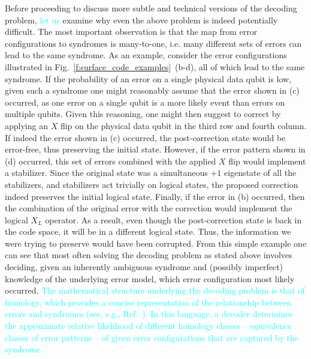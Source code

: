 \documentclass[twocolumn,preprintnumbers,amsmath,amssymb,notitlepage,nofootinbib,longbibliography,superscriptaddress,aps,pra,10pt]{revtex4-1}
\newcommand{\je}[1]{\textcolor{cyan}{#1}}
\begin{document}
	\noindent Before proceeding to discuss more subtle and technical versions of the decoding problem, \je{let us} examine why even the above problem is indeed potentially difficult.
	The most important observation is that the map from error configurations to syndromes is many-to-one, i.e. many different sets of errors can lead to the same syndrome.
	As an example, consider the error configurations illustrated in Fig.~\ref{f:surface_code_examples}~(b-d), all of which lead to the same syndrome.
	If the probability of an error on a single physical data qubit is low, given such a syndrome one might reasonably assume that the error shown in (c) occurred, as one error on a single qubit is a more likely event than errors on multiple qubits.
	Given this reasoning, one might then suggest to correct by applying an $X$ flip on the physical data qubit in the third row and fourth column.
	If indeed the error shown in (c) occurred, the post-correction state would be error-free, thus preserving the initial state.
	However, if the error pattern shown in (d) occurred, this set of errors combined with the applied $X$ flip would implement a stabilizer.
	Since the original state was a simultaneous $+1$ eigenstate of all the stabilizers, and stabilizers act trivially on logical states, the proposed correction indeed preserves the initial logical state.
	Finally, if the error in (b) occurred, then the combination of the original error with the correction would implement the logical $X_L$ operator.
	As a result, even though the post-correction state is back in the code space, it will be in a different logical state.
	Thus, the information we were trying to preserve would have been corrupted.
	From this simple example one can see that most often solving the decoding problem as stated above involves deciding, given an inherently ambiguous syndrome and (possibly imperfect) knowledge of the underlying error model, which error configuration most likely occurred.
\je{The mathematical structure underlying the decoding problem is that of homology, which provides a
	concise representation of the relationship between errors and syndromes (see, e.g., Ref.\ \cite{FastDecoders}). In this language,
	a decoder determines the approximate relative likelihood of different homology classes -- equivalence classes of
	error patterns -- of given error configurations that are
	captured by the syndrome.}
\end{document}
